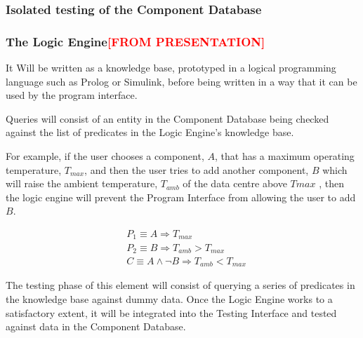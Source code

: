 \subsubsection{Isolated testing of the Component Database}

\subsubsection{The Logic Engine\textcolor{red}{[FROM PRESENTATION]}}
\label{sec:Methodology:TechnicalOverview:TheLogicEngine}
It Will be written as a knowledge base, prototyped in a logical programming language such as Prolog or Simulink, before being written in a way that it can be used by the program interface.

Queries will consist of an entity in the Component Database being checked against the list of predicates in the Logic Engine's knowledge base. 

For example, if the user chooses a component, $A$, that has a maximum operating temperature, $T_{max}$, and then the user tries to add another component, $B$ which will raise the ambient temperature, $T_{amb}$ of the data centre above $T{max}$ , then the logic engine will prevent the Program Interface from allowing the user to add $B$.


\begin{equation}
\begin{split}
&P_1 \equiv A \Rightarrow T_{max} \\
&P_2 \equiv B \Rightarrow T_{amb} > T_{max} \\
&C \equiv A \land \neg B \Rightarrow T_{amb} < T_{max}
\end{split}
\end{equation}


The testing phase of this element will consist of querying a series of predicates in the knowledge base against dummy data. Once the Logic Engine works to a satisfactory extent, it will be integrated into the Testing Interface and tested against data in the Component Database.

